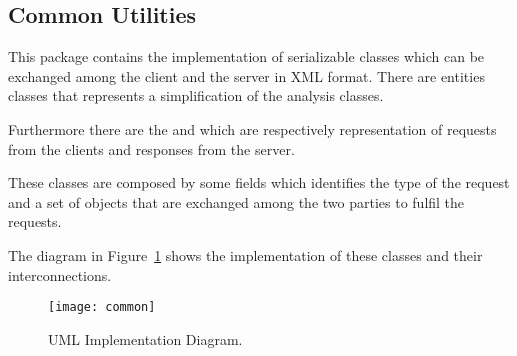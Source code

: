 \subsection{Common Utilities}

This package contains the implementation of serializable classes which can be
exchanged among the client and the server in XML format. There are entities
classes that represents a simplification of the analysis classes.

Furthermore there are the  and  which
are respectively representation of requests from the clients and responses from
the server.

These classes are composed by some fields which identifies the type of the
request and a set of  objects that are exchanged among the two
parties to fulfil the requests.

The diagram in Figure~\ref{fig:common} shows the implementation of these classes
and their interconnections.

\begin{landscape}
	\begin{figure}
		\texttt{[image: common]}
		\caption{ UML Implementation Diagram.}
		\label{fig:common}
	\end{figure}
\end{landscape}
